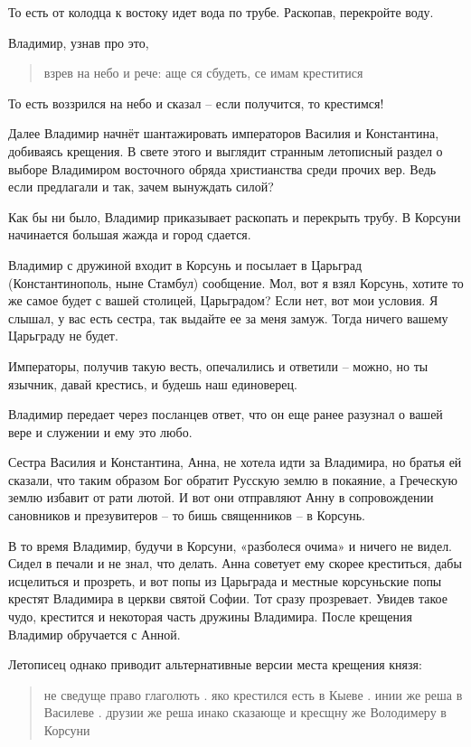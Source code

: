 \documentclass[a5paper,11pt,openany]{article}
\begin{document}
  То есть от колодца к востоку идет вода по трубе. Раскопав, перекройте воду.

   Владимир, узнав про это,

\begin{quotation}
\noindent взрев на небо и рече: аще ся сбудеть, се имам креститися
\end{quotation}

То есть воззрился на небо и сказал – если получится, то крестимся!

   Далее Владимир начнёт шантажировать императоров Василия и Константина, добиваясь крещения. В свете этого и выглядит странным летописный раздел о выборе Владимиром восточного обряда христианства среди прочих вер. Ведь если предлагали и так, зачем вынуждать силой?

   Как бы ни было, Владимир приказывает раскопать и перекрыть трубу. В Корсуни начинается большая жажда и город сдается.

   Владимир с дружиной входит в Корсунь и посылает в Царьград (Константинополь, ныне Стамбул) сообщение. Мол, вот я взял Корсунь, хотите то же самое будет с вашей столицей, Царьградом? Если нет, вот мои условия. Я слышал, у вас есть сестра, так выдайте ее за меня замуж. Тогда ничего вашему Царьграду не будет.

   Императоры, получив такую весть, опечалились и ответили – можно, но ты язычник, давай крестись, и будешь наш единоверец.

   Владимир передает через посланцев ответ, что он еще ранее разузнал о вашей вере и служении и ему это любо.

   Сестра Василия и Константина, Анна, не хотела идти за Владимира, но братья ей сказали, что таким образом Бог обратит Русскую землю в покаяние, а Греческую землю избавит от рати лютой. И вот они отправляют Анну в сопровождении сановников и презувитеров – то бишь священников – в Корсунь. 

В то время Владимир, будучи в Корсуни, «разболеся очима» и ничего не видел. Сидел в печали и не знал, что делать. Анна советует ему скорее креститься, дабы исцелиться и прозреть, и вот попы из Царьграда и местные корсуньские попы крестят Владимира в церкви святой Софии. Тот сразу прозревает. Увидев такое чудо, крестится и некоторая часть дружины Владимира. После крещения Владимир обручается с Анной.

   Летописец однако приводит альтернативные версии места крещения князя:

\begin{quotation}
\noindent не сведуще право глаголють . яко крестился есть в Кыеве . инии же реша в Василеве . друзии же реша инако сказающе и кресщну же Володимеру в Корсуни
\end{quotation}
\end{document}

